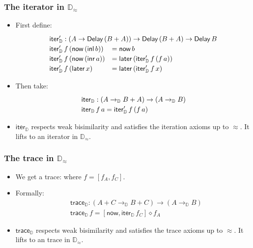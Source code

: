 \documentclass[12pt,t]{beamer}
\newcommand{\copair}[2]{[#1,#2]}
\newcommand{\inl}{\mathsf{inl}}
\newcommand{\inr}{\mathsf{inr}}
\newcommand{\Delay}{\ensuremath{\mathsf{Delay}\,}}
\newcommand{\now}{\mathsf{now}}
\newcommand{\later}{\mathsf{later}}
\newcommand{\D}{\mathbb{D}}
\newcommand{\Dapprox}{\mathbb{D}_{\approx}}
\newcommand{\iterD}{\mathsf{iter}_\D}
\newcommand{\traceD}{\mathsf{trace}_\D}
\begin{document}
\begin{frame}
  \frametitle{The iterator in $\Dapprox$}
  \begin{itemize}
    \item First define:
    \[ %
    \def\arraystretch{1.2}
    \begin{array}{ll}
      \multicolumn{2}{l}{\iterD' : (A \to \Delay (B + A)) \to \Delay (B + A) \to \Delay B} \\
      \iterD' \,f \,(\now \,(\inl\, b)) &= \now \,b \\
      \iterD' \,f \,(\now \,(\inr\, a)) &= \later \,(\iterD' \,f \,(f \,a)) \\
      \iterD' \,f \,(\later \,x) &= \later \,(\iterD' \,f \,x) \\
    \end{array}
    \]
  \item Then take:
    \[ %
    \def\arraystretch{1.2}
    \begin{array}{ll}    
      \multicolumn{2}{l}{\iterD : (A \to_\D B + A) \to (A \to_\D B)} \\
      \multicolumn{2}{l}{\iterD \,f \,a = \iterD' \,f \,(f \,a)}
    \end{array}
    \]
  \item $\iterD$ respects weak bisimilarity
    and satisfies the iteration axioms up to ${\approx}$. It lifts to
    an iterator in $\Dapprox$.
    
  \end{itemize}
  
\end{frame}

\begin{frame}
  \frametitle{The trace in $\Dapprox$}
  \begin{itemize}
    \item %
      We get a trace:
      where $f = \copair {f_A}{f_C}$.
    \item Formally:
      \begin{align*}
        & \traceD : (A + C \to_\D B + C) \to (A \to_\D B) \\
        & \traceD \,f = \copair{\now}{\iterD \,f_C}\diamond f_A
      \end{align*}
  \item $\traceD$ respects weak bisimilarity and satisfies the trace
    axioms up to ${\approx}$. It lifts to an trace in $\Dapprox$.
  \end{itemize}
\end{frame}
\end{document}
